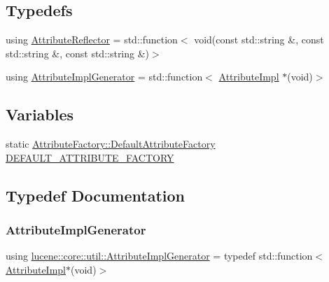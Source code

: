 \subsection*{Typedefs}
\begin{DoxyCompactItemize}
\item 
using \mbox{\hyperlink{namespacelucene_1_1core_1_1util_a7dbb701adaed055f73fb95eec83da10a}{Attribute\+Reflector}} = std\+::function$<$ void(const std\+::string \&, const std\+::string \&, const std\+::string \&)$>$
\item 
using \mbox{\hyperlink{namespacelucene_1_1core_1_1util_acbd8821be7d7b29749374e57b0a7c40b}{Attribute\+Impl\+Generator}} = std\+::function$<$ \mbox{\hyperlink{classlucene_1_1core_1_1util_1_1AttributeImpl}{Attribute\+Impl}} $\ast$(void)$>$
\end{DoxyCompactItemize}
\subsection*{Variables}
\begin{DoxyCompactItemize}
\item 
static \mbox{\hyperlink{classlucene_1_1core_1_1util_1_1AttributeFactory_1_1DefaultAttributeFactory}{Attribute\+Factory\+::\+Default\+Attribute\+Factory}} \mbox{\hyperlink{namespacelucene_1_1core_1_1util_aff58249bc13b07b9fde5d2bce9afa79e}{D\+E\+F\+A\+U\+L\+T\+\_\+\+A\+T\+T\+R\+I\+B\+U\+T\+E\+\_\+\+F\+A\+C\+T\+O\+RY}}
\end{DoxyCompactItemize}


\subsection{Typedef Documentation}
\mbox{\label{namespacelucene_1_1core_1_1util_acbd8821be7d7b29749374e57b0a7c40b}} 
\subsubsection{\texorpdfstring{Attribute\+Impl\+Generator}{AttributeImplGenerator}}
{\footnotesize\ttfamily using \mbox{\hyperlink{namespacelucene_1_1core_1_1util_acbd8821be7d7b29749374e57b0a7c40b}{lucene\+::core\+::util\+::\+Attribute\+Impl\+Generator}} = typedef std\+::function$<$\mbox{\hyperlink{classlucene_1_1core_1_1util_1_1AttributeImpl}{Attribute\+Impl}}$\ast$(void)$>$}

